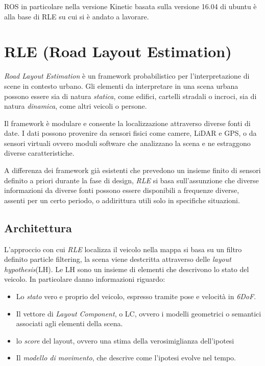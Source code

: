ROS in particolare nella versione Kinetic basata sulla versione 16.04 di ubuntu è alla base di RLE su cui si è andato a lavorare.

\section{RLE (Road Layout Estimation)}
\label{sez:RLE}

\textit{Road Layout Estimation}\cite{Ballardini2015} è un framework probabilistico per l'interpretazione di scene in contesto urbano. Gli elementi da interpretare in una scena urbana possono essere sia di natura \textit{statica}, come edifici, cartelli stradali o incroci, sia di natura \textit{dinamica}, come altri veicoli o persone.

Il framework è modulare e consente la localizzazione attraverso diverse fonti di date. I dati possono provenire da sensori fisici come camere, LiDAR e GPS, o da sensori virtuali ovvero moduli software che analizzano la scena e ne estraggono diverse caratteristiche.

A differenza dei framework già esistenti che prevedono un insieme finito di sensori definito a priori durante la fase di design, \textit{RLE} si basa sull'assunzione che diverse informazioni da diverse fonti possono essere disponibili a frequenze diverse, assenti per un certo periodo, o addirittura utili solo in specifiche situazioni. 

\subsection{Architettura}

L'approccio con cui \textit{RLE} localizza il veicolo nella mappa si basa su un filtro definito particle filtering\cite{thrun2005probabilistic}, la scena viene destcritta attraverso delle \textit{layout hypothesis}(LH). Le LH sono un insieme di elementi che descrivono lo stato del veicolo. In particolare danno informazioni riguardo:

\begin{itemize}

\item Lo \textit{stato} vero e proprio del veicolo, espresso tramite pose e velocità in \textit{6DoF}.

\item Il vettore di \textit{Layout Component}, o LC, ovvero i modelli geometrici o semantici associati agli elementi della scena.

\item lo \textit{score} del layout, ovvero una stima della verosimiglianza dell'ipotesi

\item Il \textit{modello di movimento}, che descrive come l'ipotesi evolve nel tempo.

\end{itemize}

